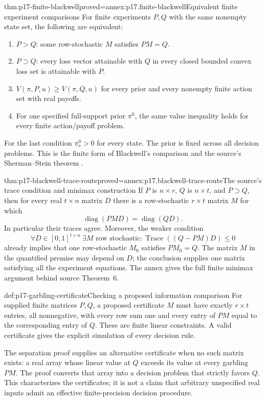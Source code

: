 \begin{hbtheorem}{thm:p17-finite-blackwell}{proved=annex:p17.finite-blackwell}{Equivalent finite experiment comparisons}
For finite experiments \(P,Q\) with the same nonempty state set, the
following are equivalent:
\begin{enumerate}
\item \(P>Q\): some row-stochastic \(M\) satisfies \(PM=Q\).
\item \(P\supset Q\): every loss vector attainable with \(Q\) in every
      closed bounded convex loss set is attainable with \(P\).
\item \(V(\pi,P,u)\geq V(\pi,Q,u)\) for every prior and every nonempty
      finite action set with real payoffs.
\item For one specified full-support prior \(\pi^0\), the same value
      inequality holds for every finite action/payoff problem.
\end{enumerate}
For the last condition \(\pi^0_s>0\) for every state. The prior is fixed
across all decision problems. This is the finite form of Blackwell's
comparison and the source's Sherman--Stein theorem
\cite[theorems~3--6, pp.~267--268]{Blackwell1953EquivalentExperiments}.
\end{hbtheorem}

\begin{hbtheorem}{thm:p17-blackwell-trace-route}{proved=annex:p17.blackwell-trace-route}{The source's trace condition and minimax construction}
If \(P\) is \(n\times r\), \(Q\) is \(n\times t\), and \(P\supset Q\),
then for every real \(t\times n\) matrix \(D\) there is a row-stochastic
\(r\times t\) matrix \(M\) for which
\[
       \operatorname{diag}(PMD)=\operatorname{diag}(QD).
\]
In particular their traces agree.
Moreover, the weaker condition
\[
 \forall D\in[0,1]^{t\times n}\ \exists M\text{ row stochastic}:
       \operatorname{Trace}((Q-PM)D)\leq0
\]
already implies that one row-stochastic \(M_0\) satisfies \(PM_0=Q\).
The matrix \(M\) in the quantified premise may depend on \(D\); the
conclusion supplies one matrix satisfying all the experiment equations.
The annex gives the full finite minimax argument behind source Theorem~6.
\end{hbtheorem}

\begin{hbmethod}{def:p17-garbling-certificate}{Checking a proposed information comparison}
For supplied finite matrices \(P,Q\), a proposed certificate \(M\) must
have exactly \(r\times t\) entries, all nonnegative, with every row sum
one and every entry of \(PM\) equal to the corresponding entry of \(Q\).
These are finite linear constraints. A valid certificate gives the explicit
simulation of every decision rule.

The separation proof supplies an alternative certificate when no such
matrix exists: a real array whose linear value at \(Q\) exceeds its value
at every garbling \(PM\). The proof converts that array into a decision
problem that strictly favors \(Q\). This characterizes the certificates;
it is not a claim that arbitrary unspecified real inputs admit an effective
finite-precision decision procedure.
\end{hbmethod}

